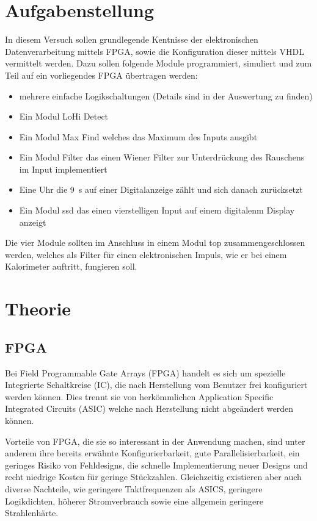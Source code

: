 \section{Aufgabenstellung}
In diesem Versuch sollen grundlegende Kentnisse der elektronischen Datenverarbeitung mittels FPGA, sowie die Konfiguration dieser mittels VHDL vermittelt werden.
Dazu sollen folgende Module programmiert, simuliert und zum Teil auf ein vorliegendes FPGA übertragen werden:
\begin{itemize}
\item mehrere einfache Logikschaltungen (Details sind in der Auswertung zu finden)
\item Ein Modul \glqq LoHi Detect\grqq{}
\item Ein Modul \glqq Max Find\grqq{} welches das Maximum des Inputs ausgibt
\item Ein Modul \glqq Filter\grqq{} das einen Wiener Filter zur Unterdrückung des Rauschens im Input implementiert
\item Eine Uhr die \SI{9}{\s} auf einer Digitalanzeige zählt und sich danach zurücksetzt
\item Ein Modul \glqq ssd\grqq{} das einen vierstelligen Input auf einem digitalenm Display anzeigt
\end{itemize}
Die vier Module sollten im Anschluss in einem Modul \glqq top\grqq{} zusammengeschlossen werden, welches als Filter für einen elektronischen Impuls, wie er bei einem Kalorimeter auftritt, fungieren soll.

\section{Theorie}

\subsection{FPGA}
Bei Field Programmable Gate Arrays (FPGA) handelt es sich um spezielle Integrierte Schaltkreise (IC), die nach Herstellung vom Benutzer frei konfiguriert werden können.
Dies trennt sie von herkömmlichen Application Specific Integrated Circuits (ASIC) welche nach Herstellung nicht abgeändert werden können.

Vorteile von FPGA, die sie so interessant in der Anwendung machen, sind unter anderem ihre bereits erwähnte Konfigurierbarkeit, gute Parallelisierbarkeit, ein geringes Risiko von Fehldesigns, die schnelle Implementierung neuer Designs und recht niedrige Kosten für geringe Stückzahlen.
Gleichzeitig existieren aber auch diverse Nachteile, wie geringere Taktfrequenzen als ASICS, geringere Logikdichten, höherer Stromverbrauch sowie eine allgemein geringere Strahlenhärte.

